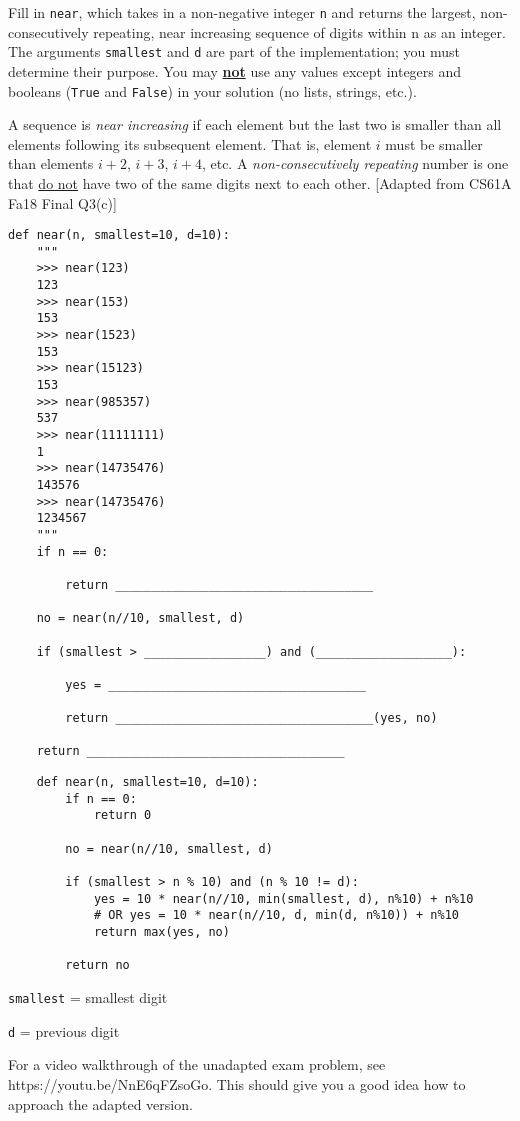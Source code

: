 \begin{blocksection}
    \question
    Fill in \lstinline{near}, which takes in a non-negative integer \lstinline{n} and returns the largest, non-consecutively repeating, near increasing sequence of digits within n as an integer. The arguments \lstinline{smallest} and \lstinline{d} are part of the implementation; you must determine their purpose. You may \underline{\textbf{not}} use any values except
    integers and booleans (\lstinline{True} and \lstinline{False}) in your solution (no lists, strings, etc.).

    A sequence is \textit{near increasing} if each element but the last two is smaller than all elements following its subsequent element. That is, element $i$ must be smaller than elements $i + 2$, $i + 3$, $i + 4$, etc. A \textit{non-consecutively repeating} number is one that \underline{do not} have two of the same digits next to each other. [Adapted from CS61A Fa18 Final Q3(c)]
    
    \begin{lstlisting}
def near(n, smallest=10, d=10):
    """
    >>> near(123)
    123
    >>> near(153)
    153
    >>> near(1523)
    153
    >>> near(15123)
    153
    >>> near(985357)
    537
    >>> near(11111111)
    1
    >>> near(14735476)
    143576
    >>> near(14735476)
    1234567
    """
    if n == 0:

        return ____________________________________

    no = near(n//10, smallest, d)

    if (smallest > _________________) and (___________________):
            
        yes = ____________________________________

        return ____________________________________(yes, no)
            
    return ____________________________________
    \end{lstlisting}
    \end{blocksection}
    
    \begin{blocksection}
    \begin{solution}
    \begin{lstlisting}
    def near(n, smallest=10, d=10):
        if n == 0:
            return 0
        
        no = near(n//10, smallest, d)

        if (smallest > n % 10) and (n % 10 != d):
            yes = 10 * near(n//10, min(smallest, d), n%10) + n%10
            # OR yes = 10 * near(n//10, d, min(d, n%10)) + n%10
            return max(yes, no)

        return no

    \end{lstlisting}
    \lstinline{smallest} = smallest digit

    \lstinline{d} = previous digit

    For a video walkthrough of the unadapted exam problem, see https://youtu.be/NnE6qFZsoGo. This should give you a good idea how to approach the adapted version.
    \end{solution}
    \end{blocksection}
    
